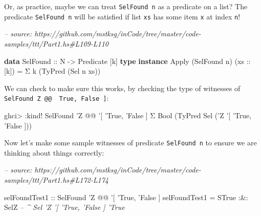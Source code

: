 \documentclass[]{article}
\newenvironment{Shaded}{}{}
\newcommand{\CommentTok}[1]{\textcolor[rgb]{0.38,0.63,0.69}{\textit{#1}}}
\newcommand{\DataTypeTok}[1]{\textcolor[rgb]{0.56,0.13,0.00}{#1}}
\newcommand{\FunctionTok}[1]{\textcolor[rgb]{0.02,0.16,0.49}{#1}}
\newcommand{\KeywordTok}[1]{\textcolor[rgb]{0.00,0.44,0.13}{\textbf{#1}}}
\newcommand{\NormalTok}[1]{#1}
\newcommand{\OtherTok}[1]{\textcolor[rgb]{0.00,0.44,0.13}{#1}}
\begin{document}
Or, as practice, maybe we can treat \texttt{SelFound\ n} as a predicate on a
list? The predicate \texttt{SelFound\ n} will be satisfied if list \texttt{xs}
has some item \texttt{x} at index \texttt{n}!

\begin{Shaded}
\begin{Highlighting}[]
\CommentTok{-- source: https://github.com/mstksg/inCode/tree/master/code-samples/ttt/Part1.hs#L109-L110}

\KeywordTok{data} \DataTypeTok{SelFound}\OtherTok{ ::} \DataTypeTok{N} \OtherTok{->} \DataTypeTok{Predicate}\NormalTok{ [k]}
\KeywordTok{type} \KeywordTok{instance} \DataTypeTok{Apply}\NormalTok{ (}\DataTypeTok{SelFound}\NormalTok{ n) (}\OtherTok{xs ::}\NormalTok{ [k]) }\FunctionTok{=}\NormalTok{ Σ k (}\DataTypeTok{TyPred}\NormalTok{ (}\DataTypeTok{Sel}\NormalTok{ n xs))}
\end{Highlighting}
\end{Shaded}

We can check to make sure this works, by checking the type of witnesses of
\texttt{SelFound\ \textquotesingle{}Z\ @@\ \textquotesingle{}{[}\ \textquotesingle{}True,\ \textquotesingle{}False\ {]}}:

\begin{Shaded}
\begin{Highlighting}[]
\NormalTok{ghci}\FunctionTok{>} \FunctionTok{:}\NormalTok{kind}\FunctionTok{!} \DataTypeTok{SelFound}\NormalTok{ '}\DataTypeTok{Z} \FunctionTok{@@}\NormalTok{ '[ '}\DataTypeTok{True}\NormalTok{, '}\DataTypeTok{False}\NormalTok{ ]}
\NormalTok{Σ }\DataTypeTok{Bool}\NormalTok{ (}\DataTypeTok{TyPred} \DataTypeTok{Sel}\NormalTok{ ('}\DataTypeTok{Z}\NormalTok{ '[ '}\DataTypeTok{True}\NormalTok{, '}\DataTypeTok{False}\NormalTok{ ]))}
\end{Highlighting}
\end{Shaded}

Now let's make some sample witnesses of predicate \texttt{SelFound\ n} to ensure
we are thinking about things correctly:

\begin{Shaded}
\begin{Highlighting}[]
\CommentTok{-- source: https://github.com/mstksg/inCode/tree/master/code-samples/ttt/Part1.hs#L172-L174}

\OtherTok{selFoundTest1 ::} \DataTypeTok{SelFound}\NormalTok{ '}\DataTypeTok{Z} \FunctionTok{@@}\NormalTok{ '[ '}\DataTypeTok{True}\NormalTok{, '}\DataTypeTok{False}\NormalTok{ ]}
\NormalTok{selFoundTest1 }\FunctionTok{=} \DataTypeTok{STrue} \FunctionTok{:&:} \DataTypeTok{SelZ}
                       \CommentTok{-- ^ Sel 'Z '[ 'True, 'False ] 'True}
\end{Highlighting}
\end{Shaded}
\end{document}
